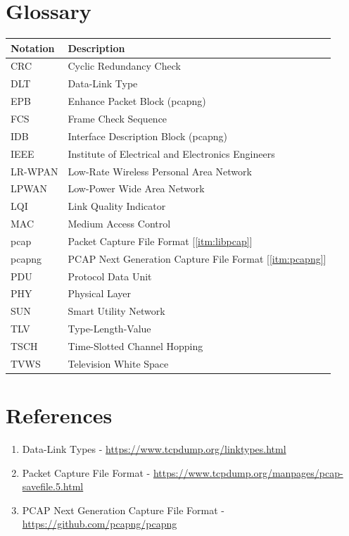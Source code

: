 \documentclass[12pt]{article}
\renewcommand\_{\textunderscore\allowbreak}
\begin{document}
\section{Glossary}\label{sec:glos}
\begin{center}
\begin{tabular}{ |p{3cm}|p{10cm}| }
\hline
\textbf{Notation}   &  \textbf{Description}\\
\hline
CRC                 &  Cyclic Redundancy Check\\
\hline
DLT                 &  Data-Link Type\\
\hline
EPB                 &  Enhance Packet Block (pcapng)\\
\hline
FCS                 &  Frame Check Sequence\\
\hline
IDB                 &  Interface Description Block (pcapng)\\
\hline
IEEE                &  Institute of Electrical and Electronics Engineers\\
\hline
LR-WPAN             &  Low-Rate Wireless Personal Area Network\\
\hline
LPWAN               &  Low-Power Wide Area Network\\
\hline
LQI                 &  Link Quality Indicator\\
\hline
MAC                 &  Medium Access Control\\
\hline
pcap                &  Packet Capture File Format [\ref{itm:libpcap}]\\
\hline
pcapng              &  PCAP Next Generation Capture File Format [\ref{itm:pcapng}]\\
\hline
PDU                 &  Protocol Data Unit\\
\hline
PHY                 &  Physical Layer\\
\hline
SUN                 &  Smart Utility Network\\
\hline
TLV                 &  Type-Length-Value\\
\hline
TSCH                &  Time-Slotted Channel Hopping\\
\hline
TVWS                &  Television White Space\\
\hline
\end{tabular}
\end{center}

\section{References}\label{sec:references}
    \begin{enumerate}
        \item Data-Link Types - \url{https://www.tcpdump.org/linktypes.html}\label{itm:linktypes}
        \item Packet Capture File Format - \url{https://www.tcpdump.org/manpages/pcap-savefile.5.html}\label{itm:libpcap}
        \item PCAP Next Generation Capture File Format - \url{https://github.com/pcapng/pcapng}\label{itm:pcapng}
    \end{enumerate}
\end{document}
